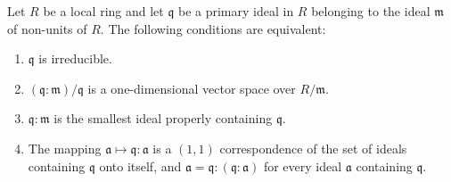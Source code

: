 Let $R$ be a local ring and let $\mathfrak{q}$ be a primary ideal in $R$ belonging to the ideal $\mathfrak{m}$ of non-units of $R$. The following conditions are equivalent:
\begin{enumerate}
\item $\mathfrak{q}$ is irreducible.
\item $(\mathfrak{q} : \mathfrak{m})/\mathfrak{q}$ is a one-dimensional vector space over $R/\mathfrak{m}$.
\item $\mathfrak{q} : \mathfrak{m}$ is the smallest ideal properly containing $\mathfrak{q}$.
\item The mapping $\mathfrak{a} \mapsto \mathfrak{q} : \mathfrak{a}$ is a $(1, 1)$ correspondence of the set of ideals containing $\mathfrak{q}$ onto itself, and $\mathfrak{a} = \mathfrak{q} : (\mathfrak{q} : \mathfrak{a})$ for every ideal $\mathfrak{a}$ containing $\mathfrak{q}$.
\end{enumerate}
